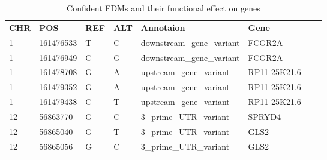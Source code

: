 \begin{table}[htb]
\begin{tabular}{llllllll}
\textbf{CHR} & \textbf{POS} & \textbf{REF} & \textbf{ALT} & \textbf{Annotaion}  & \textbf{Gene}  \\
1  & 161476533 & T & C & downstream\_gene\_variant &  FCGR2A \\
1  & 161476949 & C & G & downstream\_gene\_variant & FCGR2A \\
1  & 161478708 & G & A & upstream\_gene\_variant   & RP11-25K21.6 \\
1  & 161479352 & G & A & upstream\_gene\_variant   & RP11-25K21.6 \\
1  & 161479438 & C & T & upstream\_gene\_variant   & RP11-25K21.6 \\
12 & 56863770  & G & C & 3\_prime\_UTR\_variant    & SPRYD4 \\
12 & 56865040  & G & T & 3\_prime\_UTR\_variant    & GLS2 \\
12 & 56865056  & G & C & 3\_prime\_UTR\_variant    & GLS2 
\end{tabular}
\caption{Confident FDMs and their functional effect on genes}
\label{tab:4.2}
\end{table}
